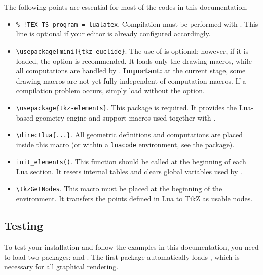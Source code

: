 The following points are essential for most of the codes in this documentation.

\begin{itemize}
\item \verb|% !TEX TS-program = lualatex|.
Compilation must be performed with . This line is optional if your editor is already configured accordingly.

\item \verb|\usepackage[mini]{tkz-euclide}|.
The use of  is optional; however, if it is loaded, the  option is recommended.
It loads only the drawing macros, while all computations are handled by .
\textbf{Important:} at the current stage, some drawing macros are not yet fully independent of computation macros.
If a compilation problem occurs, simply load  without the  option.

\item \verb|\usepackage{tkz-elements}|.
This package is required. It provides the Lua-based geometry engine and support macros used together with .

\item \verb|\directlua{...}|.
All geometric definitions and computations are placed inside this macro (or within a \texttt{luacode} environment, see the  package).

\item \verb|init_elements()|.
This function should be called at the beginning of each Lua section.
It resets internal tables and clears global variables used by .

\item \verb|\tkzGetNodes|.
This macro must be placed at the beginning of the  environment.
It transfers the points defined in Lua to TikZ as usable nodes.
\end{itemize}



\subsection{Testing}

To test your installation and follow the examples in this documentation, you need to load two packages:  and . The first package automatically loads \tkzNamePack{\TIKZ}, which is necessary for all graphical rendering.


